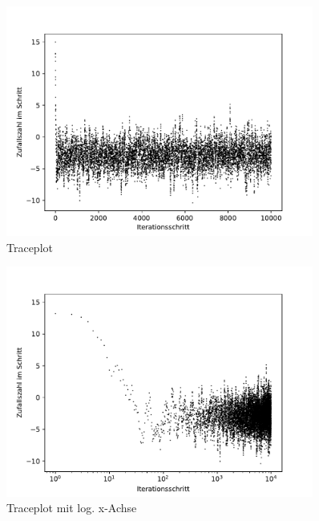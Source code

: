 \begin{figure}[H]
  \centering
  \includegraphics[width=0.9\textwidth]{15_trace.pdf}
  \caption{Traceplot}
\end{figure}

\begin{figure}[H]
  \centering
  \includegraphics[width=0.9\textwidth]{15_trace_logx.pdf}
  \caption{Traceplot mit log. x-Achse}
\end{figure}


